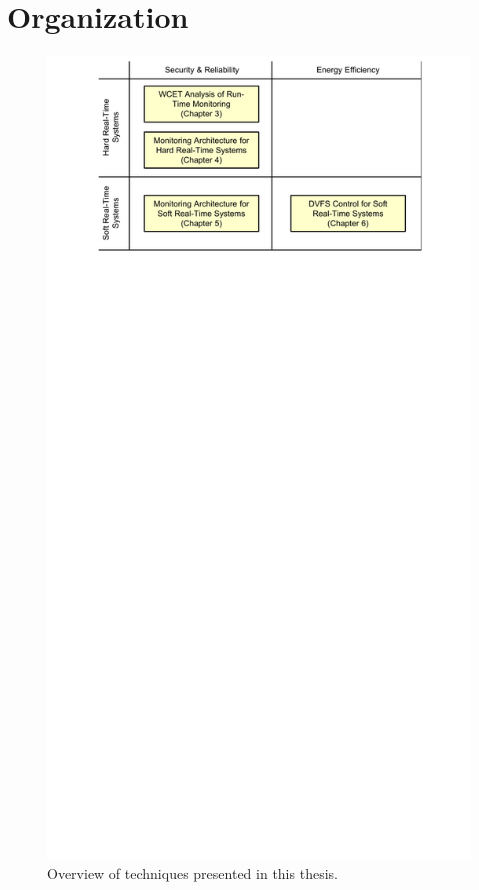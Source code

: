 \section{Organization}

\begin{figure}
  \begin{center}
    \includegraphics{figs/thesis_overview.pdf}
    \caption{Overview of techniques presented in this thesis.}
    \label{fig:intro.thesis_overview}
  \end{center}
\end{figure}

